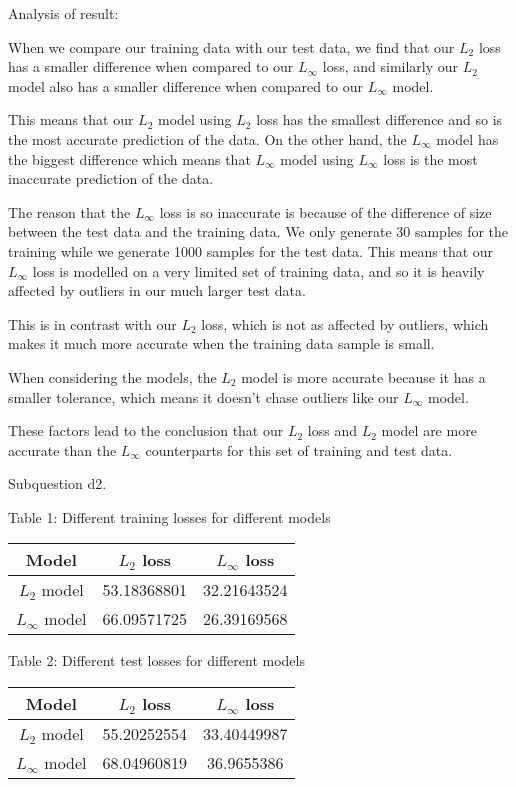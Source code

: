\documentclass[12pt]{article}
\newcounter{ques}
\newenvironment{question}{\stepcounter{ques}{\noindent\bf Question \arabic{ques}:}}{\vspace{5mm}}
\begin{document}
\begin{question}
Analysis of result:

When we compare our training data with our test data, we find that our $L_2$ loss has a smaller difference when compared to our $L_{\infty}$ loss, and similarly our $L_2$ model also has a smaller difference when compared to our $L_{\infty}$ model.

This means that our $L_2$ model using $L_2$ loss has the smallest difference and so is the most accurate prediction of the data. On the other hand, the $L_{\infty}$ model has the biggest difference which means that $L_{\infty}$ model using $L_{\infty}$ loss is the most inaccurate prediction of the data.

The reason that the $L_{\infty}$ loss is so inaccurate is because of the difference of size between the test data and the training data. We only generate 30 samples for the training while we generate 1000 samples for the test data. This means that our $L_{\infty}$ loss is modelled on a very limited set of training data, and so it is heavily affected by outliers in our much larger test data.

This is in contrast with our $L_2$ loss, which is not as affected by outliers, which makes it much more accurate when the training data sample is small.

When considering the models, the $L_2$ model is more accurate because it has a smaller tolerance, which means it doesn't chase outliers like our $L_{\infty}$ model.

These factors lead to the conclusion that our $L_2$ loss and $L_2$ model are more accurate than the $L_{\infty}$ counterparts for this set of training and test data.

\quad

Subquestion d2.

\begin{center}
Table 1: Different training losses for different models
\end{center}
\begin{table}[h]
\centering
\begin{tabular}{c|cc}
    \textbf{Model} & $L_2$ loss & $L_\infty$ loss \\
    \hline
    $L_2$ model   &      53.18368801      &         32.21643524        \\
    $L_\infty$ model &      66.09571725      &           26.39169568      
\end{tabular}
\end{table}

\begin{center}
Table 2: Different test losses for different models
\end{center}
\begin{table}[h]
\centering
\begin{tabular}{c|cc}
    \textbf{Model} & $L_2$ loss & $L_\infty$ loss \\
    \hline
    $L_2$ model   &      55.20252554      &        33.40449987         \\
    $L_\infty$ model &      68.04960819      &         36.9655386        
\end{tabular}
\end{table}

\end{question}
\end{document}
